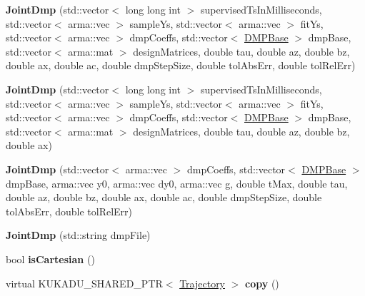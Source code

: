 \begin{DoxyCompactItemize}
\item 
{\bfseries Joint\+Dmp} (std\+::vector$<$ long long int $>$ supervised\+Ts\+In\+Milliseconds, std\+::vector$<$ arma\+::vec $>$ sample\+Ys, std\+::vector$<$ arma\+::vec $>$ fit\+Ys, std\+::vector$<$ arma\+::vec $>$ dmp\+Coeffs, std\+::vector$<$ \hyperlink{classkukadu_1_1DMPBase}{D\+M\+P\+Base} $>$ dmp\+Base, std\+::vector$<$ arma\+::mat $>$ design\+Matrices, double tau, double az, double bz, double ax, double ac, double dmp\+Step\+Size, double tol\+Abs\+Err, double tol\+Rel\+Err)\hypertarget{classkukadu_1_1JointDmp_a5ec13e30604be7e8908c0ce14378ccca}{}\label{classkukadu_1_1JointDmp_a5ec13e30604be7e8908c0ce14378ccca}

\item 
{\bfseries Joint\+Dmp} (std\+::vector$<$ long long int $>$ supervised\+Ts\+In\+Milliseconds, std\+::vector$<$ arma\+::vec $>$ sample\+Ys, std\+::vector$<$ arma\+::vec $>$ fit\+Ys, std\+::vector$<$ arma\+::vec $>$ dmp\+Coeffs, std\+::vector$<$ \hyperlink{classkukadu_1_1DMPBase}{D\+M\+P\+Base} $>$ dmp\+Base, std\+::vector$<$ arma\+::mat $>$ design\+Matrices, double tau, double az, double bz, double ax)\hypertarget{classkukadu_1_1JointDmp_a43b867c418528a01785f5ea053acb8b6}{}\label{classkukadu_1_1JointDmp_a43b867c418528a01785f5ea053acb8b6}

\item 
{\bfseries Joint\+Dmp} (std\+::vector$<$ arma\+::vec $>$ dmp\+Coeffs, std\+::vector$<$ \hyperlink{classkukadu_1_1DMPBase}{D\+M\+P\+Base} $>$ dmp\+Base, arma\+::vec y0, arma\+::vec dy0, arma\+::vec g, double t\+Max, double tau, double az, double bz, double ax, double ac, double dmp\+Step\+Size, double tol\+Abs\+Err, double tol\+Rel\+Err)\hypertarget{classkukadu_1_1JointDmp_ab2a3f58ba2c3a336a0fcec4f1f2167a0}{}\label{classkukadu_1_1JointDmp_ab2a3f58ba2c3a336a0fcec4f1f2167a0}

\item 
{\bfseries Joint\+Dmp} (std\+::string dmp\+File)\hypertarget{classkukadu_1_1JointDmp_a4984be2815b7a0b1e6f14ecee33593b2}{}\label{classkukadu_1_1JointDmp_a4984be2815b7a0b1e6f14ecee33593b2}

\item 
bool {\bfseries is\+Cartesian} ()\hypertarget{classkukadu_1_1JointDmp_a12d8909497b9d4f38c1cac86a1ad6601}{}\label{classkukadu_1_1JointDmp_a12d8909497b9d4f38c1cac86a1ad6601}

\item 
virtual K\+U\+K\+A\+D\+U\+\_\+\+S\+H\+A\+R\+E\+D\+\_\+\+P\+TR$<$ \hyperlink{classkukadu_1_1Trajectory}{Trajectory} $>$ {\bfseries copy} ()\hypertarget{classkukadu_1_1JointDmp_ac3fd610d7a8e2f74143071d06ae04290}{}\label{classkukadu_1_1JointDmp_ac3fd610d7a8e2f74143071d06ae04290}

\end{DoxyCompactItemize}
